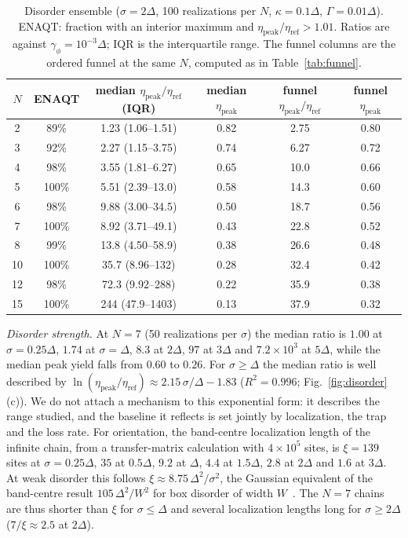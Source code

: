 \documentclass[aps,pre,preprint,floatfix]{revtex4-2}
\newcommand{\gp}{\gamma_\phi}
\newcommand{\etap}{\eta_\text{peak}}
\newcommand{\etar}{\eta_\text{ref}}
\newcommand{\enh}{\etap/\etar}
\begin{document}
\begin{table}[htbp]
\caption{\label{tab:disorder}Disorder ensemble ($\sigma=2\Delta$, 100
  realizations per $N$, $\kappa=0.1\Delta$, $\Gamma=0.01\Delta$).
  ENAQT: fraction with an interior maximum and $\enh>1.01$.
  Ratios are against $\gp=10^{-3}\Delta$; IQR is the interquartile range.
  The funnel columns are the ordered funnel at the same $N$, computed as in
  Table~\ref{tab:funnel}.}
\begin{ruledtabular}
\begin{tabular}{cccccc}
$N$ & ENAQT & median $\enh$ (IQR) & median $\etap$ & funnel $\enh$
  & funnel $\etap$ \\
\hline
 2 & 89\%  & 1.23 (1.06--1.51) & 0.82 & 2.75 & 0.80 \\
 3 & 92\%  & 2.27 (1.15--3.75) & 0.74 & 6.27 & 0.72 \\
 4 & 98\%  & 3.55 (1.81--6.27) & 0.65 & 10.0 & 0.66 \\
 5 & 100\% & 5.51 (2.39--13.0) & 0.58 & 14.3 & 0.60 \\
 6 & 98\%  & 9.88 (3.00--34.5) & 0.50 & 18.7 & 0.56 \\
 7 & 100\% & 8.92 (3.71--49.1) & 0.43 & 22.8 & 0.52 \\
 8 & 99\%  & 13.8 (4.50--58.9) & 0.38 & 26.6 & 0.48 \\
10 & 100\% & 35.7 (8.96--132)  & 0.28 & 32.4 & 0.42 \\
12 & 98\%  & 72.3 (9.92--288)  & 0.22 & 35.9 & 0.38 \\
15 & 100\% & 244 (47.9--1403)  & 0.13 & 37.9 & 0.32 \\
\end{tabular}
\end{ruledtabular}
\end{table}

\textit{Disorder strength.}
At $N=7$ (50 realizations per $\sigma$) the median ratio is $1.00$ at
$\sigma=0.25\Delta$, $1.74$ at $\sigma=\Delta$, $8.3$ at $2\Delta$, $97$ at
$3\Delta$ and $7.2\times10^{3}$ at $5\Delta$, while the median peak yield
falls from $0.60$ to $0.26$.
For $\sigma\ge\Delta$ the median ratio is well described by
$\ln(\enh)\approx2.15\,\sigma/\Delta-1.83$ ($R^2=0.996$;
Fig.~\ref{fig:disorder}(c)).
We do not attach a mechanism to this exponential form: it describes the range
studied, and the baseline it reflects is set jointly by localization, the
trap and the loss rate.
For orientation, the band-centre localization length of the infinite chain,
from a transfer-matrix calculation with $4\times10^{5}$ sites, is
$\xi=139$ sites at $\sigma=0.25\Delta$, $35$ at $0.5\Delta$, $9.2$ at
$\Delta$, $4.4$ at $1.5\Delta$, $2.8$ at $2\Delta$ and $1.6$ at $3\Delta$.
At weak disorder this follows $\xi\approx8.75\,\Delta^2/\sigma^2$, the
Gaussian equivalent of the band-centre result $105\,\Delta^2/W^2$ for box
disorder of width $W$~\cite{kappus1981}.
The $N=7$ chains are thus shorter than $\xi$ for $\sigma\le\Delta$ and several
localization lengths long for $\sigma\ge2\Delta$ ($7/\xi\approx2.5$ at
$2\Delta$).
\end{document}
